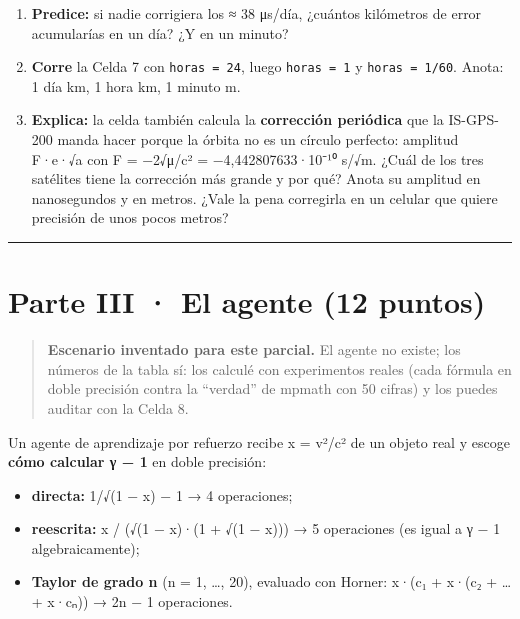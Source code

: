 \begin{enumerate}
\def\labelenumi{\alph{enumi})}
\item
  \textbf{Predice:} si nadie corrigiera los ≈ 38 μs/día, ¿cuántos kilómetros de error acumularías en un día? ¿Y en un minuto?
\item
  \textbf{Corre} la Celda 7 con \texttt{horas\ =\ 24}, luego \texttt{horas\ =\ 1} y \texttt{horas\ =\ 1/60}. Anota: 1 día  km, 1 hora  km, 1 minuto  m.
\item
  \textbf{Explica:} la celda también calcula la \textbf{corrección periódica} que la IS-GPS-200 manda hacer porque la órbita no es un círculo perfecto: amplitud \textbar F\textbar·e·√a con F = −2√μ/c² = −4,442807633·10⁻¹⁰ s/√m. ¿Cuál de los tres satélites tiene la corrección más grande y por qué? Anota su amplitud en nanosegundos y en metros. ¿Vale la pena corregirla en un celular que quiere precisión de unos pocos metros?
\end{enumerate}

\begin{center}\rule{0.5\linewidth}{0.5pt}\end{center}

\section{Parte III · El agente (12 puntos)}

\begin{quote}
\textbf{Escenario inventado para este parcial.} El agente no existe; los números de la tabla sí: los calculé con experimentos reales (cada fórmula en doble precisión contra la ``verdad'' de mpmath con 50 cifras) y los puedes auditar con la Celda 8.
\end{quote}

Un agente de aprendizaje por refuerzo recibe x = v²/c² de un objeto real y escoge \textbf{cómo calcular γ − 1} en doble precisión:

\begin{itemize}
\tightlist
\item
  \textbf{directa:} 1/√(1 − x) − 1 → 4 operaciones;
\item
  \textbf{reescrita:} x / (√(1 − x)·(1 + √(1 − x))) → 5 operaciones (es igual a γ − 1 algebraicamente);
\item
  \textbf{Taylor de grado n} (n = 1, \ldots, 20), evaluado con Horner: x·(c₁ + x·(c₂ + \ldots{} + x·cₙ)) → 2n − 1 operaciones.
\end{itemize}

